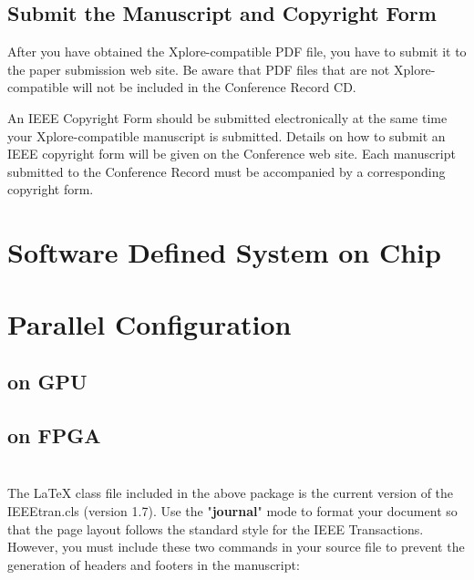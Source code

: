 \documentclass[journal]{IEEEtran}
\begin{document}
\subsection{Submit the Manuscript and Copyright Form}

After you have obtained the Xplore-compatible PDF file, you have to submit it to the paper submission web site. Be aware that PDF files that are not Xplore-compatible will not be included in the Conference Record CD.


An IEEE Copyright Form should be submitted electronically at the same time your Xplore-compatible manuscript is submitted. Details on how to submit an IEEE copyright form will be given on the Conference web site.  Each manuscript submitted to the Conference Record must be accompanied by a corresponding copyright form. 


\section{Software Defined System on Chip}

\section{Parallel Configuration}

\subsection{on GPU}

\subsection{on FPGA}

\newpage


\appendices
\section{}

The {\LaTeX} class file included in the above package is the current version of the IEEEtran.cls (version 1.7).  Use the "{\bf journal}" mode to format your document so that the page layout follows the standard style for the IEEE Transactions. However, you must include these two commands in your source file to prevent the generation of headers and footers in the manuscript:
\end{document}
